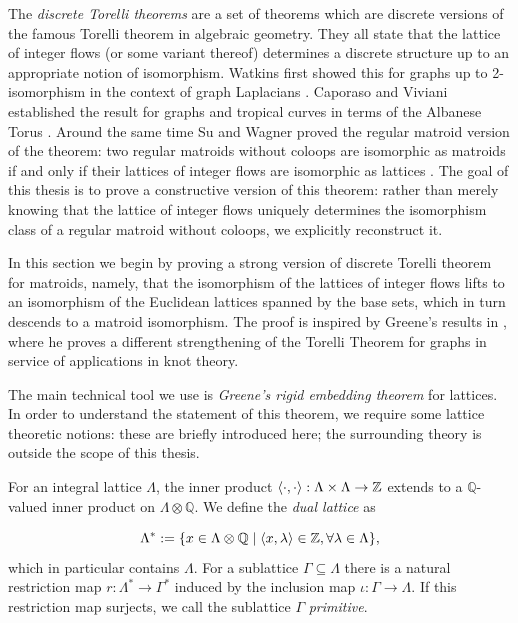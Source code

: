 \documentclass[12pt]{report}
\theoremstyle{definition}
\DeclarePairedDelimiter\iprod{\langle}{\rangle}
\def\Q{\mathbb Q}
\def\Z{\mathbb Z}
\theoremstyle{upright}
\begin{document}
The \textit{discrete Torelli theorems} are a set of theorems which are discrete versions of the famous Torelli theorem in algebraic geometry.
They all state that the lattice of integer flows (or some variant thereof) determines a discrete structure up to an appropriate notion of isomorphism.
Watkins first showed this for graphs up to 2-isomorphism in the context of graph Laplacians \cite{Watkins-1990} \cite{Watkins-1994}.
Caporaso and Viviani established the result for graphs and tropical curves in terms of the Albanese Torus \cite{caporaso2010torelli}. Around the same time
Su and Wagner proved the regular matroid version of the theorem: two regular matroids without coloops are isomorphic as matroids if and only if their lattices of integer flows are isomorphic as lattices \cite{su2010lattice}.
The goal of this thesis is to prove a constructive version of this theorem: rather than merely knowing that the lattice of integer flows uniquely determines the isomorphism class of a regular matroid without coloops, we explicitly reconstruct it.

In this section we begin by proving a strong version of discrete Torelli theorem for matroids, namely, that the isomorphism of the lattices of integer flows lifts to an isomorphism of the Euclidean lattices spanned by the base sets, which in turn descends to a matroid isomorphism.
The proof is inspired by Greene's results in \cite{greene2013lattices}, where he proves a different strengthening of the Torelli Theorem for graphs in service of applications in knot theory.

The main technical tool we use is
\textit{Greene's rigid embedding theorem} \cite[Prop 2.8]{greene2013lattices} for lattices.
In order to understand the statement of this theorem, we require some lattice theoretic notions:
these are briefly introduced here; the surrounding theory is outside the scope of this thesis.

For an integral lattice $\Lambda$, the inner product $\iprod*{\cdot, \cdot}:\Lambda\times\Lambda\rightarrow\Z$ extends to a $\Q$-valued inner product on $\Lambda\otimes\Q$.
We define the \textit{dual lattice} as

\[\Lambda^*:=\{x\in\Lambda\otimes\Q\;|\;\iprod*{x, \lambda}\in\Z, \forall\lambda\in\Lambda\},\]
which in particular contains $\Lambda$.
For a sublattice $\Gamma\subseteq\Lambda$ there is a natural restriction map $r:\Lambda^*\rightarrow\Gamma^*$ induced by the inclusion map $\iota:\Gamma\rightarrow\Lambda$.
If this restriction map surjects, we call the sublattice $\Gamma$ \textit{primitive}.
\end{document}

